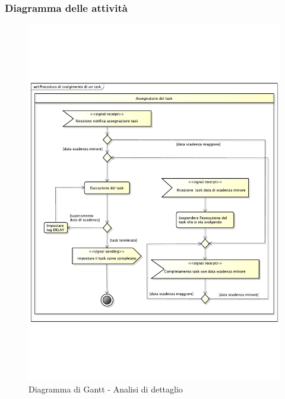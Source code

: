 		\subsubsection{Diagramma delle attività} %
		\label{ssub:diagramma_delle_attivita}
			\begin{figure}[htbp]
				\centering
				\includegraphics[width=14cm]{images/proc_svolgimento_task.pdf}
				\caption{Diagramma di Gantt - Analisi di dettaglio}
				\label{fig:gantt_analisi_dettaglio}				
			\end{figure}
	
